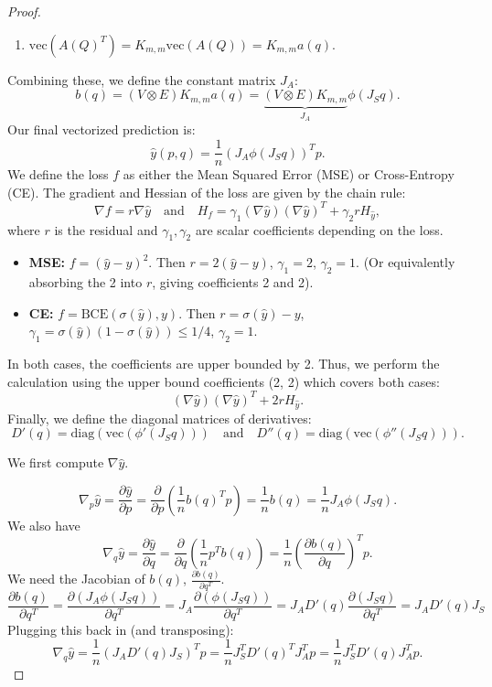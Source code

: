 \documentclass[a4paper,11pt]{article}
\newcommand{\1}{\mathbbm{1}}
\theoremstyle{plain}
\newcommand{\vecop}{\mathrm{vec}}
\newcommand{\diag}{\mathrm{diag}}
\begin{document}
\begin{proof}
\begin{enumerate}
    \item $\vecop(A(Q)^T) = K_{m,m} \vecop(A(Q)) = K_{m,m} a(q)$.
\end{enumerate}
Combining these, we define the constant matrix $J_A$:
$$
b(q) = (V \otimes E) K_{m,m} a(q) = \underbrace{(V \otimes E) K_{m,m}}_{J_A} \phi(J_S q).
$$
Our final vectorized prediction is:
$$
\hat{y}(p, q) = \frac{1}{n} (J_A \phi(J_S q))^T p.
$$
We define the loss $f$ as either the Mean Squared Error (MSE) or Cross-Entropy (CE).
The gradient and Hessian of the loss are given by the chain rule:
$$
\nabla f = r \nabla \hat{y} \quad \text{and} \quad H_f = \gamma_1 (\nabla \hat{y})(\nabla \hat{y})^T + \gamma_2 r H_{\hat{y}},
$$
where $r$ is the residual and $\gamma_1, \gamma_2$ are scalar coefficients depending on the loss.
\begin{itemize}
    \item \textbf{MSE:} $f = (\hat{y}-y)^2$. Then $r = 2(\hat{y}-y)$, $\gamma_1 = 2$, $\gamma_2 = 1$. (Or equivalently absorbing the 2 into $r$, giving coefficients 2 and 2).
    \item \textbf{CE:} $f = \text{BCE}(\sigma(\hat{y}), y)$. Then $r = \sigma(\hat{y})-y$, $\gamma_1 = \sigma(\hat{y})(1-\sigma(\hat{y})) \le 1/4$, $\gamma_2 = 1$.
\end{itemize}
In both cases, the coefficients are upper bounded by 2. Thus, we perform the calculation using the upper bound coefficients (2, 2) which covers both cases:
$$
(\nabla \hat{y})(\nabla \hat{y})^T + 2r H_{\hat{y}}.
$$
Finally, we define the diagonal matrices of derivatives:
$$
D'(q) = \diag(\vecop(\phi'(J_S q))) \quad \text{and} \quad D''(q) = \diag(\vecop(\phi''(J_S q))).
$$

We first compute $\nabla \hat{y}$.

$$
\nabla_p \hat{y} = \frac{\partial \hat{y}}{\partial p} = \frac{\partial}{\partial p} \left( \frac{1}{n} b(q)^T p \right) = \frac{1}{n} b(q) = \frac{1}{n} J_A \phi(J_S q).
$$
We also have
$$
\nabla_q \hat{y} = \frac{\partial \hat{y}}{\partial q} = \frac{\partial}{\partial q} \left( \frac{1}{n} p^T b(q) \right) = \frac{1}{n} \left( \frac{\partial b(q)}{\partial q} \right)^T p.
$$
We need the Jacobian of $b(q)$, $\frac{\partial b(q)}{\partial q^T}$.
$$
\frac{\partial b(q)}{\partial q^T} = \frac{\partial (J_A \phi(J_S q))}{\partial q^T} = J_A \frac{\partial (\phi(J_S q))}{\partial q^T} = J_A D'(q) \frac{\partial (J_S q)}{\partial q^T} = J_A D'(q) J_S
$$
Plugging this back in (and transposing):
$$
\nabla_q \hat{y} = \frac{1}{n} (J_A D'(q) J_S)^T p = \frac{1}{n} J_S^T D'(q)^T J_A^T p = \frac{1}{n} J_S^T D'(q) J_A^T p.
$$


\end{proof}
\end{document}
